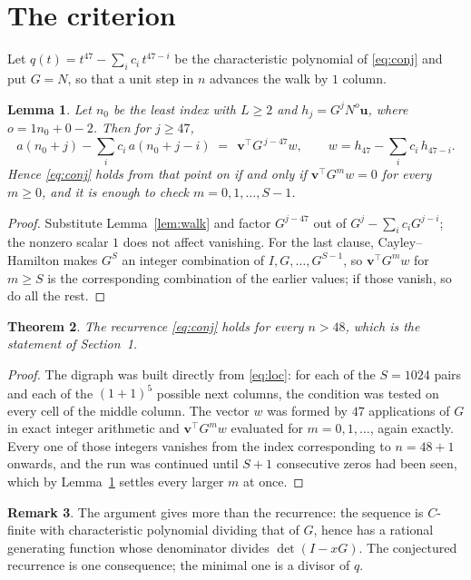 \documentclass[11pt,a4paper]{article}
\theoremstyle{plain}
\newtheorem{theorem}{Theorem}
\newtheorem{lemma}[theorem]{Lemma}
\theoremstyle{definition}
\newtheorem{remark}[theorem]{Remark}
\begin{document}
\section{The criterion}

Let $q(t)=t^{47}-\sum_i c_i\,t^{47-i}$ be the characteristic polynomial of
\eqref{eq:conj} and put $G=N$, so that a unit step in $n$ advances the walk by
$1$ column.

\begin{lemma}\label{lem:crit}
Let $n_0$ be the least index with $L\ge2$ and $h_j=G^{j}N^{o}\mathbf{u}$, where
$o=1n_0+0-2$. Then for $j\ge47$,
\[
a(n_0+j)-\sum_i c_i\,a(n_0+j-i)\;=\;\,\mathbf{v}^{\!\top}G^{\,j-47}w,
\qquad w=h_{47}-\sum_i c_i\,h_{47-i} .
\]
Hence \eqref{eq:conj} holds from that point on if and only if
$\mathbf{v}^{\!\top}G^{m}w=0$ for every $m\ge0$, and it is enough to check
$m=0,1,\dots,S-1$.
\end{lemma}

\begin{proof}
Substitute Lemma~\ref{lem:walk} and factor $G^{j-47}$ out of
$G^{j}-\sum_ic_iG^{j-i}$; the nonzero scalar $1$ does not affect
vanishing. For the last clause, Cayley--Hamilton makes $G^{S}$ an integer combination of
$I,G,\dots,G^{S-1}$, so $\mathbf{v}^{\!\top}G^{m}w$ for $m\ge S$ is the corresponding
combination of the earlier values; if those vanish, so do all the rest.
\end{proof}

\begin{theorem}
The recurrence \eqref{eq:conj} holds for every $n>48$, which is the statement of
Section~1.
\end{theorem}

\begin{proof}
The digraph was built directly from \eqref{eq:loc}: for each of the $S=1024$ pairs and each
of the $(1+1)^{5}$ possible next columns, the condition was tested on every cell of
the middle column. The vector $w$ was formed by $47$ applications of $G$ in exact integer
arithmetic and $\mathbf{v}^{\!\top}G^{m}w$ evaluated for $m=0,1,\dots$, again exactly.
Every one of those integers vanishes from the index corresponding to $n=48+1$ onwards,
and the run was continued until $S+1$ consecutive zeros had been seen, which by
Lemma~\ref{lem:crit} settles every larger $m$ at once.
\end{proof}

\begin{remark}
The argument gives more than the recurrence: the sequence is $C$-finite with characteristic
polynomial dividing that of $G$, hence has a rational generating function whose denominator
divides $\det(I-xG)$. The conjectured recurrence is one consequence; the minimal one is a
divisor of $q$.
\end{remark}
\end{document}
